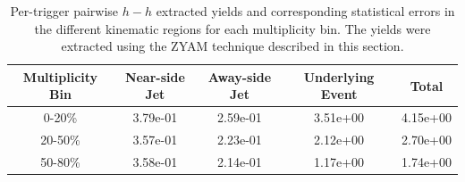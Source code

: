 \documentclass[ALICE,manyauthors]{ALICE_analysis_notes}
\begin{document}
\begin{table}[h!]
\centering
\begin{tabular}{| c | c | c | c | c | }
\hline
Multiplicity Bin & Near-side Jet & Away-side Jet & Underlying Event & Total  \\
\hline

0-20\% & 3.79e-01  & 2.59e-01  & 3.51e+00 & 4.15e+00 \\
20-50\% & 3.57e-01 & 2.23e-01  & 2.12e+00 & 2.70e+00 \\
50-80\% & 3.58e-01 & 2.14e-01  & 1.17e+00 & 1.74e+00 \\

\hline
\end{tabular}
\caption{Per-trigger pairwise $h-h$ extracted yields and corresponding statistical errors in the different kinematic regions for each multiplicity bin. The yields were extracted using the ZYAM technique described in this section.}
\label{h_h_yield_table_zyam}
\end{table}

\clearpage
\end{document}
